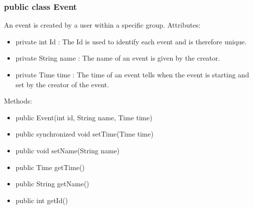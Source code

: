 	\subsubsection{public class Event}
	An event is created by a user within a specific group.
	\newline Attributes:
	\begin{itemize}
	\item private  int Id : The Id is used to identify each event and is therefore unique.
	\item private String name : The name of an event is given by the creator.
	\item private Time time : The time of an event tells when the event is starting and set by the creator of the event.
	\end{itemize}
	Methods:
	\begin{itemize}
	\item public Event(int id, String name, Time time)
	\item public synchronized void setTime(Time time)
	\item public void setName(String name)
	\item public Time getTime()
	\item public String getName()
	\item public int getId()
	\end{itemize}

